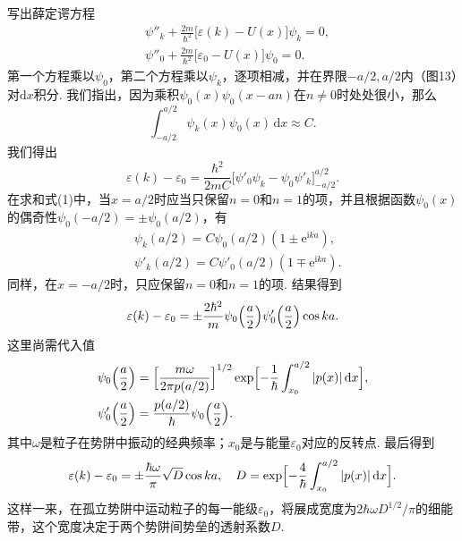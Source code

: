 \begin{xiti}
写出薛定谔方程
\begin{equation*}
\begin{aligned}
&\psi''_k+\frac{2m}{\hbar^2}\bigl[\varepsilon(k)-U(x)\bigr]\psi_k=0,\\
&\psi''_0+\frac{2m}{\hbar^2}\bigl[\varepsilon_0-U(x)\bigr]\psi_0=0.
\end{aligned}
\end{equation*}
第一个方程乘以$\psi_0$，第二个方程乘以$\psi_k$，逐项相减，并在界限$-a/2,a/2$内（图13）对$\mathrm dx$积分. 我们指出，因为乘积$\psi_0(x)\psi_0(x-an)$在$n\neq0$时处处很小，那么
\begin{equation*}
\int_{-a/2}^{a/2}\psi_k(x)\psi_0(x)\,\mathrm dx\approx C.
\end{equation*}
我们得出
\begin{equation*}
\varepsilon(k)-\varepsilon_0=\frac{\hbar^2}{2mC}
\bigl[\psi'_0\psi_k-\psi_0\psi'_k\bigr]_{-a/2}^{a/2}.
\end{equation*}
在求和式(1)中，当$x=a/2$时应当只保留$n=0$和$n=1$的项，并且根据函数$\psi_0(x)$的偶奇性$\psi_0(-a/2)=\pm\psi_0(a/2)$，有
\begin{equation*}
\begin{aligned}
&\psi_k(a/2)=C\psi_0(a/2)(1\pm\mathrm e^{\mathrm i ka}),\\
&\psi'_k(a/2)=C\psi'_0(a/2)(1\mp\mathrm e^{\mathrm i ka}).
\end{aligned}
\end{equation*}
同样，在$x=-a/2$时，只应保留$n=0$和$n=1$的项. 结果得到
\begin{equation*}
\varepsilon(k)-\varepsilon_0=\pm\frac{2\hbar^2}{m}\psi_0\Bigl(\frac{a}{2}\Bigr)\psi'_0\Bigl(\frac{a}{2}\Bigr)\cos ka.
\end{equation*}
这里尚需代入值
\begin{equation*}
\begin{aligned}
&\psi_0\Bigl(\frac{a}{2}\Bigr)=\Bigl[\frac{m\omega}{2\pi p(a/2)}\Bigr]^{1/2}
\exp\Bigl[-\frac{1}{\hbar}\int_{x_0}^{a/2}|p(x)|\,\mathrm dx\Bigr],\\
&\psi'_0\Bigl(\frac{a}{2}\Bigr)=\frac{p(a/2)}{\hbar}\psi_0\Bigl(\frac{a}{2}\Bigr).
\end{aligned}
\end{equation*}
其中$\omega$是粒子在势阱中振动的经典频率；$x_0$是与能量$\varepsilon_0$对应的反转点. 最后得到
\begin{equation*}
\varepsilon(k)-\varepsilon_0=\pm\frac{\hbar\omega}{\pi}\sqrt{D}\cos ka,\quad
D=\exp\Bigl[-\frac{4}{\hbar}\int_{x_0}^{a/2}|p(x)|\,\mathrm dx\Bigr].
\end{equation*}
这样一来，在孤立势阱中运动粒子的每一能级$\varepsilon_0$，将展成宽度为$2\hbar\omega D^{1/2}/\pi$的细能带，这个宽度决定于两个势阱间势垒的透射系数$D$.

\end{xiti}

